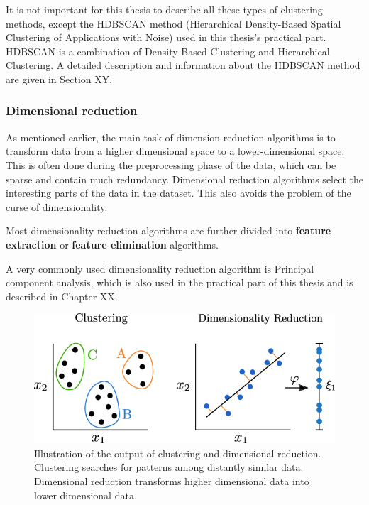 It is not important for this thesis to describe all these types of clustering methods, except the HDBSCAN method (Hierarchical Density-Based Spatial Clustering of Applications with Noise) used in this thesis's practical part. HDBSCAN is a combination of Density-Based Clustering and Hierarchical Clustering. A detailed description and information about the HDBSCAN method are given in Section XY.

\subsubsection{Dimensional reduction}

As mentioned earlier, the main task of dimension reduction algorithms is to transform data from a higher dimensional space to a lower-dimensional space\cite{ml-types2}. This is often done during the preprocessing phase of the data, which can be sparse and contain much redundancy. Dimensional reduction algorithms select the interesting parts of the data in the dataset. This also avoids the problem of the curse of dimensionality\cite{bellman1957dynamic}.

Most dimensionality reduction algorithms are further divided into \textbf{feature extraction} or \textbf{feature elimination} algorithms\cite{ml-types2}.

A very commonly used dimensionality reduction algorithm is Principal component analysis, which is also used in the practical part of this thesis and is described in Chapter XX.

\begin{figure}[ht]
    \centering
    \includegraphics[width=1\linewidth]{media/clustering-reduction.png}
    \caption{Illustration of the output of clustering and dimensional reduction. Clustering searches for patterns among distantly similar data. Dimensional reduction transforms higher dimensional data into lower dimensional data.\cite{clustering-reduction}}
    \label{fig:clustering-reduction}
\end{figure}

